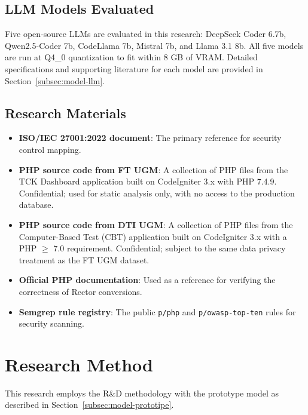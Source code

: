 \subsection{LLM Models Evaluated}

Five open-source LLMs are evaluated in this research: DeepSeek Coder 6.7b, Qwen2.5-Coder 7b, CodeLlama 7b, Mistral 7b, and Llama 3.1 8b. All five models are run at Q4\_0 quantization to fit within 8 GB of VRAM. Detailed specifications and supporting literature for each model are provided in Section~\ref{subsec:model-llm}.

\subsection{Research Materials}

\begin{itemize}

    \item \textbf{ISO/IEC 27001:2022 document}: The primary reference for security control mapping.

    \item \textbf{PHP source code from FT UGM}: A collection of PHP files from the TCK Dashboard application built on CodeIgniter 3.x with PHP 7.4.9. Confidential; used for static analysis only, with no access to the production database.

    \item \textbf{PHP source code from DTI UGM}: A collection of PHP files from the Computer-Based Test (CBT) application built on CodeIgniter 3.x with a PHP $\geq$ 7.0 requirement. Confidential; subject to the same data privacy treatment as the FT UGM dataset.

    \item \textbf{Official PHP documentation}: Used as a reference for verifying the correctness of Rector conversions.

    \item \textbf{Semgrep rule registry}: The public \texttt{p/php} and \texttt{p/owasp-top-ten} rules for security scanning.

\end{itemize}

\section{Research Method}

This research employs the R\&D methodology with the prototype model as described in Section~\ref{subsec:model-prototipe}.

